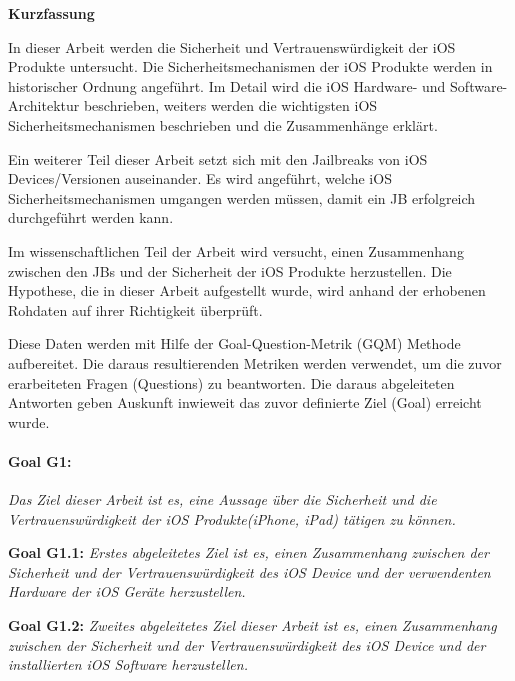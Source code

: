 %
%
% 
% 
% 



\cleardoublepage

\begin{center}
{\Large\bfseries Kurzfassung}
\end{center}
In dieser Arbeit werden die Sicherheit und Vertrauenswürdigkeit der iOS Produkte untersucht. Die Sicherheitsmechanismen der iOS Produkte werden in historischer Ordnung angeführt. Im Detail wird die iOS Hardware- und Software-Architektur beschrieben, weiters werden die wichtigsten iOS Sicherheitsmechanismen beschrieben und die Zusammenhänge erklärt. \par 
Ein weiterer Teil dieser Arbeit setzt sich mit den Jailbreaks von iOS Devices/Versionen auseinander. Es wird angeführt, welche iOS Sicherheitsmechanismen umgangen werden müssen, damit ein JB erfolgreich durchgeführt werden kann. \par 
Im wissenschaftlichen Teil der Arbeit wird versucht, einen Zusammenhang zwischen den JBs und der Sicherheit der iOS Produkte herzustellen. Die Hypothese, die in dieser Arbeit aufgestellt wurde, wird anhand der erhobenen Rohdaten auf ihrer Richtigkeit überprüft. \par
Diese Daten werden mit Hilfe der Goal-Question-Metrik (GQM) Methode aufbereitet. Die daraus resultierenden Metriken werden verwendet, um die zuvor erarbeiteten Fragen (Questions) zu beantworten. Die daraus abgeleiteten Antworten geben Auskunft inwieweit das zuvor definierte Ziel (Goal) erreicht wurde.\par 

\paragraph{Goal G1:}\textit{\glqq Das Ziel dieser Arbeit ist es, eine Aussage über die Sicherheit und die Vertrauenswürdigkeit der iOS Produkte(iPhone, iPad) tätigen zu können.\grqq{}} \par
\textbf{Goal G1.1:} \textit{\glqq Erstes abgeleitetes Ziel ist es, einen Zusammenhang zwischen der Sicherheit und der Vertrauenswürdigkeit des iOS Device und der verwendenten Hardware der iOS Geräte herzustellen.\grqq{}} \par 
\textbf{Goal G1.2:} \textit{\glqq Zweites abgeleitetes Ziel dieser Arbeit ist es, einen Zusammenhang zwischen der Sicherheit und der Vertrauenswürdigkeit des iOS Device und der installierten iOS Software herzustellen.\grqq{}}

